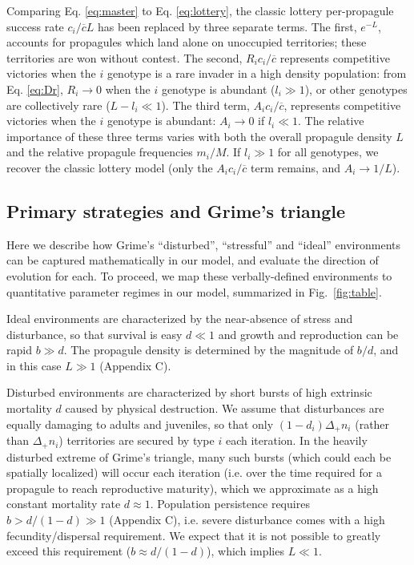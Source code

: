 \documentclass[11pt]{article}
\begin{document}
Comparing Eq. \eqref{eq:master} to Eq. \eqref{eq:lottery}, the classic lottery per-propagule success rate $c_i/\overline{c}L$ has been replaced by three separate terms. The first, $e^{-L}$, accounts for propagules which land alone on unoccupied territories; these territories are won without contest. The second, $R_i c_i/\overline{c}$ represents competitive victories when the $i$ genotype is a rare invader in a high density population: from Eq. \eqref{eq:Dr}, $R_i\rightarrow 0$ when the $i$ genotype is abundant ($l_i\gg 1$), or other genotypes are collectively rare ($L-l_i\ll 1$). The third term, $A_ic_i/\overline{c}$, represents competitive victories when the $i$ genotype is abundant: $A_i\rightarrow 0$ if $l_i\ll 1$. The relative importance of these three terms varies with both the overall propagule density $L$ and the relative propagule frequencies $m_i/M$. If $l_i\gg 1$ for all genotypes, we recover the classic lottery model (only the $A_ic_i/\overline{c}$ term remains, and $A_i\rightarrow 1/L$). 

\subsection*{Primary strategies and Grime's triangle}

Here we describe how Grime's ``disturbed'', ``stressful'' and ``ideal'' environments can be captured mathematically in our model, and evaluate the direction of evolution for each. To proceed, we map these verbally-defined environments to quantitative parameter regimes in our model, summarized in Fig.~\ref{fig:table}. 

Ideal environments are characterized by the near-absence of stress and disturbance, so that survival is easy $d\ll 1$ and growth and reproduction can be rapid $b\gg d$. The propagule density is determined by the magnitude of $b/d$, and in this case $L\gg 1$ (Appendix C).

Disturbed environments are characterized by short bursts of high extrinsic mortality $d$ caused by physical destruction. We assume that disturbances are equally damaging to adults and juveniles, so that only $(1-d_i)\Delta_+ n_i$ (rather than $\Delta_+ n_i$) territories are secured by type $i$ each iteration. In the heavily disturbed extreme of Grime's triangle, many such bursts (which could each be spatially localized) will occur each iteration (i.e. over the time required for a propagule to reach reproductive maturity), which we approximate as a high constant mortality rate $d\approx 1$. Population persistence requires $b>d/(1-d)\gg 1$ (Appendix C), i.e. severe disturbance comes with a high fecundity/dispersal requirement. We expect that it is not possible to greatly exceed this requirement ($b\approx d/(1-d)$), which implies $L\ll 1$. 
 
\end{document}
